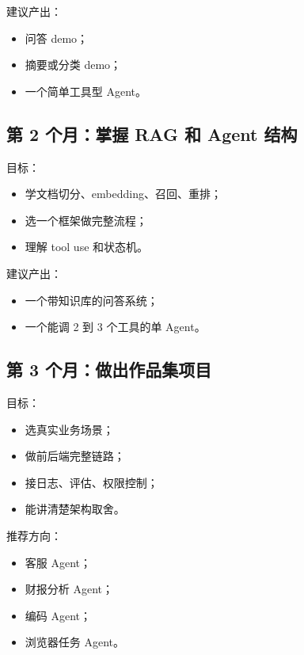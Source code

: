 建议产出：


\begin{itemize}[leftmargin=2em]
\item 问答 demo；
\item 摘要或分类 demo；
\item 一个简单工具型 Agent。
\end{itemize}

\subsection{第 2 个月：掌握 RAG 和 Agent 结构}

目标：


\begin{itemize}[leftmargin=2em]
\item 学文档切分、embedding、召回、重排；
\item 选一个框架做完整流程；
\item 理解 tool use 和状态机。
\end{itemize}

建议产出：


\begin{itemize}[leftmargin=2em]
\item 一个带知识库的问答系统；
\item 一个能调 2 到 3 个工具的单 Agent。
\end{itemize}

\subsection{第 3 个月：做出作品集项目}

目标：


\begin{itemize}[leftmargin=2em]
\item 选真实业务场景；
\item 做前后端完整链路；
\item 接日志、评估、权限控制；
\item 能讲清楚架构取舍。
\end{itemize}

推荐方向：


\begin{itemize}[leftmargin=2em]
\item 客服 Agent；
\item 财报分析 Agent；
\item 编码 Agent；
\item 浏览器任务 Agent。
\end{itemize}

